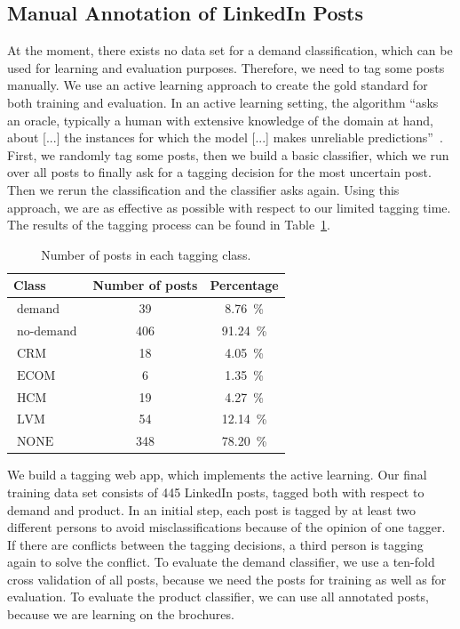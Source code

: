 \subsection{Manual Annotation of LinkedIn Posts}

At the moment, there exists no data set for a demand classification, which can be used for learning and evaluation purposes.
Therefore, we need to tag some posts manually.
We use an active learning approach to create the gold standard for both training and evaluation.
In an active learning setting, the algorithm ``asks an oracle, typically a human with extensive knowledge of the domain at hand, about [...] the instances for which the model [...] makes unreliable predictions''~\cite{olsson2009literature}.
First, we randomly tag some posts, then we build a basic classifier, which we run over all posts to finally ask for a tagging decision for the most uncertain post.
Then we rerun the classification and the classifier asks again.
Using this approach, we are as effective as possible with respect to our limited tagging time.
The results of the tagging process can be found in Table~\ref{table:data_overview}.

\begin{table}[h]
	\centering
	\begin{tabular}{lcc}
		\hline
		\textbf{Class} & \textbf{Number of posts} & \textbf{Percentage} \\
		\hline
		\hline
		$\operatorname{demand}$ & 39 & 8.76~\% \\
		\hline
		$\operatorname{no-demand}$ & 406 & 91.24~\% \\
		\hline
		\hline
		$\operatorname{CRM}$ & 18 & 4.05~\% \\
		\hline
		$\operatorname{ECOM}$ & 6 & 1.35~\% \\
		\hline
		$\operatorname{HCM}$ & 19 & 4.27~\% \\
		\hline
		$\operatorname{LVM}$ & 54 & 12.14~\% \\
		\hline
		$\operatorname{NONE}$ & 348 & 78.20~\% \\
		\hline
	\end{tabular}
	\caption{Number of posts in each tagging class.}
	\label{table:data_overview}
\end{table}

We build a tagging web app, which implements the active learning.
Our final training data set consists of 445 LinkedIn posts, tagged both with respect to demand and product.
In an initial step, each post is tagged by at least two different persons to avoid misclassifications because of the opinion of one tagger.
If there are conflicts between the tagging decisions, a third person is tagging again to solve the conflict.
To evaluate the demand classifier, we use a ten-fold cross validation of all posts, because we need the posts for training as well as for evaluation.
To evaluate the product classifier, we can use all annotated posts, because we are learning on the brochures.

